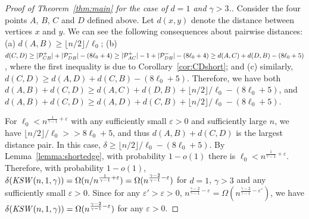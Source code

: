 \documentclass[11pt]{article}
\def\KSW{{\it KSW }}
\begin{document}
\begin{proof}
[Proof of Theorem~\ref{thm:main} for the case of $d=1$ and $\gamma>3$.]
Consider the four points $A$, $B$, $C$ and $D$ defined above. 
Let $d(x,y)$ denote the distance between vertices $x$ and $y$.
We can see the following consequences about pairwise distances: 
	(a) $d(A,B) \ge \lfloor n/2\rfloor/\ell_0$; 
	(b) $d(C,D) \ge |{\cal P}_{CB}^+| +  |{\cal P}_{DB}^-| - (8\ell_0+4)
	\ge |{\cal P}_{AC}^+|-1 +  |{\cal P}_{DB}^-| - (8\ell_0+4)
	\ge d(A,C) + d(D,B) - (8\ell_0+5)$, where the first inequality is
	due to Corollary~\ref{cor:CDshort}; and
	(c) similarly, $d(C,D) \ge d(A,D) + d(C,B) - (8\ell_0+5)$.
Therefore, we have both 
	$d(A,B) + d(C,D) \ge  d(A,C) + d(D,B) + \lfloor n/2\rfloor/\ell_0 
	- (8\ell_0+5)$, and 
	$d(A,B) + d(C,D) \ge  d(A,D) + d(C,B) + \lfloor n/2\rfloor/\ell_0 
	- (8\ell_0+5)$.


For $\ell_0<n^{\frac{1}{\gamma-1}+\varepsilon}$ with any sufficiently small
	$\varepsilon > 0$ and sufficiently large $n$, we have 
	$\lfloor n/2\rfloor/\ell_0>>8\ell_0+5$,  
	and thus $d(A,B) + d(C,D)$ is the largest
	distance pair. 
In this case, $\delta\geq\lfloor n/2\rfloor/\ell_0-(8\ell_0+5)$. By Lemma~\ref{lemma:shortedge}, with probability $1-o(1)$ there is $\ell_0<n^{\frac{1}{\gamma-1}+\varepsilon}$. Therefore, with probability $1-o(1)$, 
	$\delta(\KSW(n,1,\gamma))=\Omega(n/n^{\frac{1}{\gamma-1}+\varepsilon})=
	\Omega(n^{\frac{\gamma-2}{\gamma-1}-\varepsilon})$ for $d=1$, $\gamma>3$ and 
	any sufficiently small $\varepsilon>0$.
Since for any $\varepsilon' > \varepsilon > 0$, 
	$n^{\frac{\gamma-2}{\gamma-1}-\varepsilon} = 
	\Omega(n^{\frac{\gamma-2}{\gamma-1}-\varepsilon'})$, we have
	$\delta(\KSW(n,1,\gamma))= \Omega(n^{\frac{\gamma-2}{\gamma-1}-\varepsilon})$
	for any $\varepsilon > 0$.
%
%
%
%
\end{proof}
\end{document}

